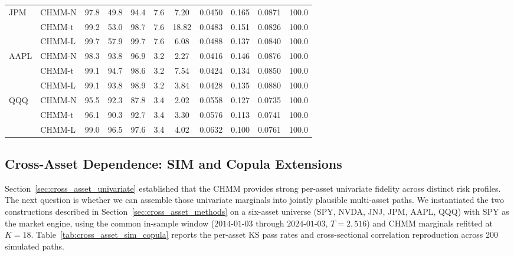 \begin{table}[t]
{\begin{tabular}{l l cc c cc c c c c}
JPM  & CHMM-N & 97.8 & 49.8 & 94.4 & 7.6 & 7.20  & 0.0450 & 0.165 & 0.0871 & 100.0 \\
     & CHMM-t & 99.2 & 53.0 & 98.7 & 7.6 & 18.82 & 0.0483 & 0.151 & 0.0826 & 100.0 \\
     & CHMM-L & 99.7 & 57.9 & 99.7 & 7.6 & 6.08  & 0.0488 & 0.137 & 0.0840 & 100.0 \\
\midrule
AAPL & CHMM-N & 98.3 & 93.8 & 96.9 & 3.2 & 2.27  & 0.0416 & 0.146 & 0.0876 & 100.0 \\
     & CHMM-t & 99.1 & 94.7 & 98.6 & 3.2 & 7.54  & 0.0424 & 0.134 & 0.0850 & 100.0 \\
     & CHMM-L & 99.1 & 93.8 & 98.9 & 3.2 & 3.84  & 0.0428 & 0.135 & 0.0880 & 100.0 \\
\midrule
QQQ  & CHMM-N & 95.5 & 92.3 & 87.8 & 3.4 & 2.02  & 0.0558 & 0.127 & 0.0735 & 100.0 \\
     & CHMM-t & 96.1 & 90.3 & 92.7 & 3.4 & 3.30  & 0.0576 & 0.113 & 0.0741 & 100.0 \\
     & CHMM-L & 99.0 & 96.5 & 97.6 & 3.4 & 4.02  & 0.0632 & 0.100 & 0.0761 & 100.0 \\
\bottomrule
\end{tabular}%
}
\end{table}

\subsection{Cross-Asset Dependence: SIM and Copula Extensions}
\label{sec:cross_asset}

Section~\ref{sec:cross_asset_univariate} established that the CHMM provides strong per-asset univariate fidelity across distinct risk profiles.
The next question is whether we can assemble those univariate marginals into jointly plausible multi-asset paths.
We instantiated the two constructions described in Section~\ref{sec:cross_asset_methods} on a six-asset universe (SPY, NVDA, JNJ, JPM, AAPL, QQQ) with SPY as the market engine, using the common in-sample window ($2014$-$01$-$03$ through $2024$-$01$-$03$, $T = 2{,}516$) and CHMM marginals refitted at $K = 18$.
Table~\ref{tab:cross_asset_sim_copula} reports the per-asset KS pass rates and cross-sectional correlation reproduction across 200 simulated paths.

